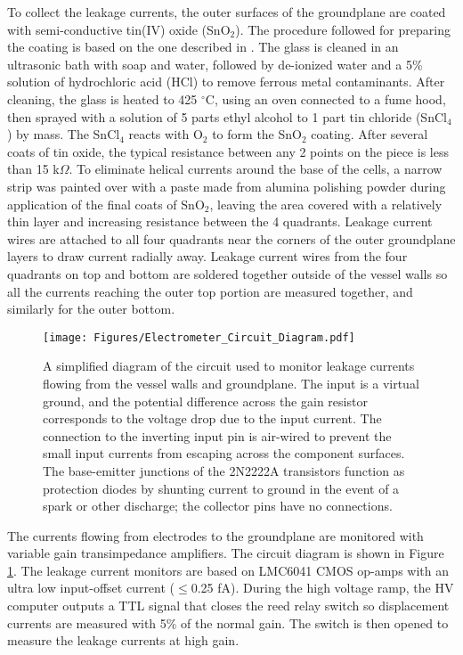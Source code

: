 \documentclass [10pt, twoside] {uwthesis}[2012/04/02]
\begin{document}
To collect the leakage currents, the outer surfaces of the groundplane are coated with semi-conductive tin(IV) oxide (SnO$_2$). The procedure followed for preparing the coating is based on the one described in \cite{Griffith}. The glass is cleaned in an ultrasonic bath with soap and water, followed by de-ionized water and a 5\% solution of hydrochloric acid (HCl) to remove ferrous metal contaminants. After cleaning, the glass is heated to 425 $^{\circ}$C, using an oven connected to a fume hood, then sprayed with a solution of 5 parts ethyl alcohol to 1 part tin chloride (SnCl$_4$) by mass. The SnCl$_4$ reacts with O$_2$ to form the SnO$_2$ coating. After several coats of tin oxide, the typical resistance between any 2 points on the piece is less than 15 k$\Omega$. To eliminate helical currents around the base of the cells, a narrow strip was painted over with a paste made from alumina polishing powder during application of the final coats of SnO$_2$, leaving the area covered with a relatively thin layer and increasing resistance between the 4 quadrants. Leakage current wires are attached to all four quadrants near the corners of the outer groundplane layers to draw current radially away. Leakage current wires from the four quadrants on top and bottom are soldered together outside of the vessel walls so all the currents reaching the outer top portion are measured together, and similarly for the outer bottom. 

\begin{figure}
\begin{center}
\texttt{[image: Figures/Electrometer\_Circuit\_Diagram.pdf]}
\end{center}
\caption[Circuit diagram of leakage current monitors]
{\narrower A simplified diagram of the circuit used to monitor leakage currents flowing from the vessel walls and groundplane. The input is a virtual ground, and the potential difference across the gain resistor corresponds to the voltage drop due to the input current. The connection to the inverting input pin is air-wired to prevent the small input currents from escaping across the component surfaces. The base-emitter junctions of the 2N2222A transistors function as protection diodes by shunting current to ground in the event of a spark or other discharge; the collector pins have no connections.}
\label{ElectrometerDiagram}
\end{figure}

The currents flowing from electrodes to the groundplane are monitored with variable gain transimpedance amplifiers. The circuit diagram is shown in Figure \ref{ElectrometerDiagram}. The leakage current monitors are based on LMC6041 CMOS op-amps with an ultra low input-offset current ($\leq$0.25 fA). During the high voltage ramp, the HV computer outputs a TTL signal that closes the reed relay switch so displacement currents are measured with 5\% of the normal gain. The switch is then opened to measure the leakage currents at high gain. 
\end{document}
